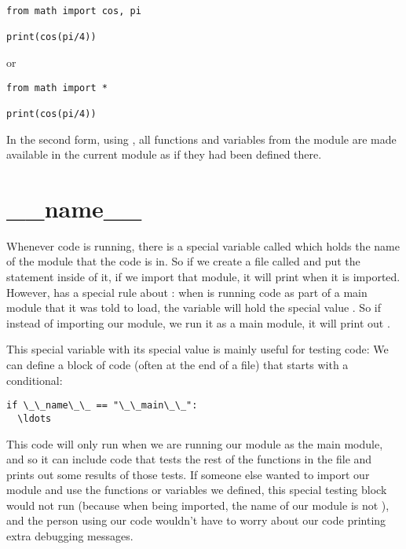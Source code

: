 \documentclass{handout}
\begin{document}
\begin{lstlisting}
from math import cos, pi

print(cos(pi/4))
\end{lstlisting}

or

\begin{lstlisting}
from math import *

print(cos(pi/4))
\end{lstlisting}

In the second form, using \code{*}, all functions and variables from the  module are made available in the current module as if they had been defined there.


\section{\_\_name\_\_}

Whenever \python code is running, there is a special variable called  which holds the name of the module that the code is in. So if we create a file called  and put the statement  inside of it, if we import that module, it will print  when it is imported. However, \python has a special rule about : when \python is running code as part of a main module that it was told to load, the  variable will hold the special value . So if instead of importing our  module, we run it as a main module, it will print out .

This special variable with its special value is mainly useful for testing code: We can define a block of code (often at the end of a file) that starts with a conditional:

\begin{lstlisting}
if \_\_name\_\_ == "\_\_main\_\_":
  \ldots
\end{lstlisting}

This code will only run when we are running our module as the main module, and so it can include code that tests the rest of the functions in the file and prints out some results of those tests. If someone else wanted to import our module and use the functions or variables we defined, this special testing block would not run (because when being imported, the name of our module is not ), and the person using our code wouldn't have to worry about our code printing extra debugging messages.
\end{document}
